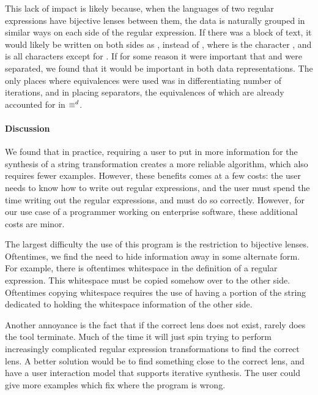 \documentclass[numbers,10pt,preprint\ifanon ,nocopyrightspace\fi]{sigplanconf}
\begin{document}
This lack of impact is likely because, when the languages of two regular expressions have
bijective lenses between them, the data is naturally grouped in similar ways on each
side of the regular expression.  If there was a block of text, it would likely
be written on both sides as , instead of , where
 is the character , and  is all characters except for
.  If for some reason it were important that  and  were
separated, we found that it would be important in both data representations.
The only places where \StarRegexType{} equivalences were used was in
differentiating number of iterations, and in placing separators, the
equivalences of which are already accounted for in $\equiv^d$.

\paragraph*{Discussion}

We found that in practice, requiring a user to put in more information for the
synthesis of a string transformation creates a more reliable algorithm, which
also requires fewer examples.
However, these benefits comes at a few costs: the user needs to know how to write out
regular expressions, and the user must spend the time writing out the regular
expressions, and must do so correctly.  However, for our use case of a
programmer working on enterprise software, these additional costs are minor.

The largest difficulty the use of this program is the restriction to bijective lenses.
Oftentimes, we find the need to hide information away in some alternate form.
For example, there is oftentimes whitespace in the definition of a regular
expression.  This whitespace must be copied somehow over to the other side.
Oftentimes copying whitespace requires the use of having a portion of the string dedicated to
holding the whitespace information of the other side.

Another annoyance is the fact that if the correct lens does not exist,
rarely does the tool terminate.  Much of the time it will just spin trying to
perform increasingly complicated regular expression transformations to find the
correct lens.
A better solution would be to find something close to the correct lens, and have
a user interaction model that supports iterative synthesis.  The user could give
more examples which fix where the program is wrong.
\end{document}
